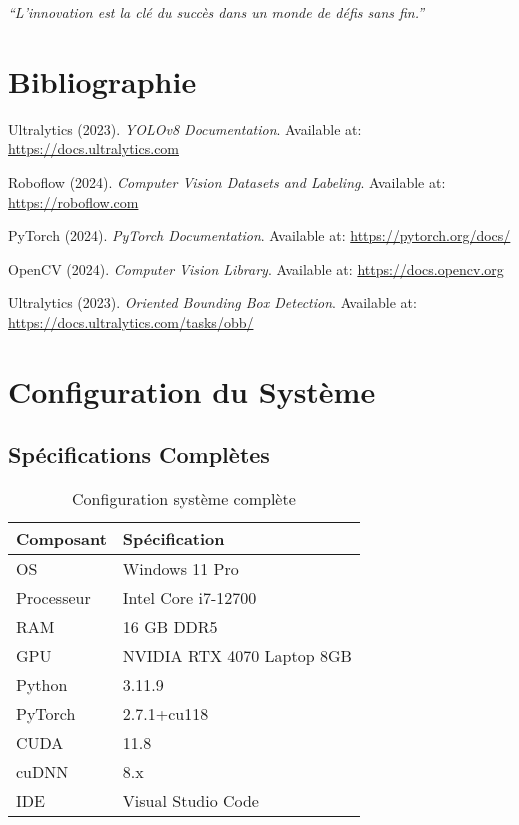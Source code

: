 \documentclass[a4paper,12pt]{report}
\begin{document}
\vfill
\centering
\textit{``L'innovation est la clé du succès dans un monde de défis sans fin.''}

\chapter{Bibliographie}

\begin{thebibliography}{99}

 Ultralytics (2023). \textit{YOLOv8 Documentation}. 
Available at: \url{https://docs.ultralytics.com}

 Roboflow (2024). \textit{Computer Vision Datasets and Labeling}. 
Available at: \url{https://roboflow.com}

 PyTorch (2024). \textit{PyTorch Documentation}. 
Available at: \url{https://pytorch.org/docs/}

 OpenCV (2024). \textit{Computer Vision Library}. 
Available at: \url{https://docs.opencv.org}

 Ultralytics (2023). \textit{Oriented Bounding Box Detection}. 
Available at: \url{https://docs.ultralytics.com/tasks/obb/}

\end{thebibliography}

\appendix

\chapter{Configuration du Système}

\section{Spécifications Complètes}

\begin{table}[H]
    \centering
    \begin{tabular}{|l|l|}
    \hline
    \textbf{Composant} & \textbf{Spécification} \\
    \hline
    OS & Windows 11 Pro \\
    \hline
    Processeur & Intel Core i7-12700 \\
    \hline
    RAM & 16 GB DDR5 \\
    \hline
    GPU & NVIDIA RTX 4070 Laptop 8GB \\
    \hline
    Python & 3.11.9 \\
    \hline
    PyTorch & 2.7.1+cu118 \\
    \hline
    CUDA & 11.8 \\
    \hline
    cuDNN & 8.x \\
    \hline
    IDE & Visual Studio Code \\
    \hline
    \end{tabular}
    \caption{Configuration système complète}
\end{table}
\end{document}
